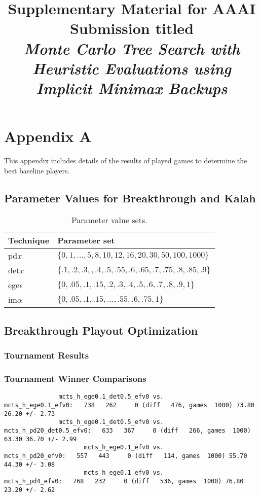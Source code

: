 \documentclass{article}
\title{Supplementary Material for AAAI Submission titled\\{\it Monte Carlo Tree Search with Heuristic Evaluations using Implicit Minimax Backups}}
\author{}
\date{}
\begin{document}
\maketitle %

\section{Appendix A}

This appendix includes details of the results of played games to determine the best baseline players. 

\subsection{Parameter Values for Breakthrough and Kalah}

\begin{table}[h!]
\begin{center}
\begin{tabular}{|l|l|}
\hline
Technique & Parameter set \\
\hline
pd$x$          & $\{ 0, 1, \ldots, 5, 8, 10, 12, 16, 20, 30, 50, 100, 1000 \}$ \\
det$x$         & $\{ .1, .2, .3, , .4, .5, .55, .6, .65, .7, .75, .8, .85, .9 \}$ \\
ege$\epsilon$  & $\{ 0, .05, .1, .15, .2, .3, .4, .5, .6, .7, .8, .9, 1 \}$ \\
im$\alpha$     & $\{ 0, .05, .1, .15, \ldots, .55, .6, .75, 1 \}$ \\
\hline
\end{tabular}
\end{center}
\caption{Parameter value sets.}
\label{tbl:parmsets}
\end{table}

\subsection{Breakthrough Playout Optimization}

\subsubsection{Tournament Results}

\subsubsection{Tournament Winner Comparisons}

\begin{verbatim}
               mcts_h_ege0.1_det0.5_efv0 vs.                       mcts_h_ege0.1_efv0:   738   262     0 (diff   476, games  1000) 73.80 26.20 +/- 2.73
               mcts_h_ege0.1_det0.5_efv0 vs.                  mcts_h_pd20_det0.5_efv0:   633   367     0 (diff   266, games  1000) 63.30 36.70 +/- 2.99
                      mcts_h_ege0.1_efv0 vs.                         mcts_h_pd20_efv0:   557   443     0 (diff   114, games  1000) 55.70 44.30 +/- 3.08
                      mcts_h_ege0.1_efv0 vs.                          mcts_h_pd4_efv0:   768   232     0 (diff   536, games  1000) 76.80 23.20 +/- 2.62
\end{verbatim}
\end{document}
